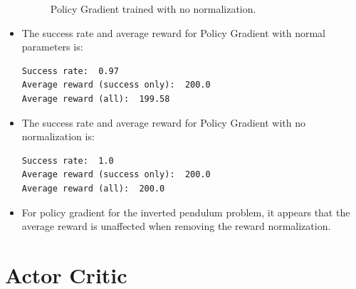 \documentclass[12pt]{article}
\newcommand{\0}{\boldsymbol{0}}
\newcommand{\1}{\boldsymbol{1}}
\begin{document}
\begin{itemize}
\begin{figure}[H]
\begin{minipage}{0.45\textwidth}
            \caption{Policy Gradient trained with no normalization.}
            \label{fig:fig2}
        \end{minipage}
    \end{figure}

    \item The success rate and average reward for Policy Gradient with normal parameters is:
    \begin{verbatim}
Success rate:  0.97
Average reward (success only):  200.0
Average reward (all):  199.58
    \end{verbatim}

    \item The success rate and average reward for Policy Gradient with no normalization is:
    \begin{verbatim}
Success rate:  1.0
Average reward (success only):  200.0
Average reward (all):  200.0
    \end{verbatim}

    \item For policy gradient for the inverted pendulum problem, it appears that the average reward is unaffected when removing the reward normalization.
    
\end{itemize}

\newpage

\section{Actor Critic}
\end{document}
